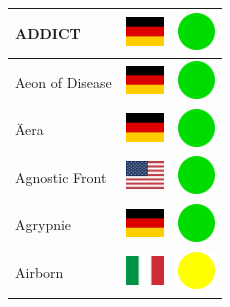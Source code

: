 \documentclass[12pt, a4paper, twoside]{report}
\begin{document}
\begin{center}
\begin{longtable}{|p{5cm}|p{2cm}|p{2cm}|}
			ADDICT & \includegraphics[width=1cm]{4x3/de} & \includegraphics[width=1cm]{likes/y} \\ \hline
			Aeon of Disease & \includegraphics[width=1cm]{4x3/de} & \includegraphics[width=1cm]{likes/y} \\ \hline
			Äera & \includegraphics[width=1cm]{4x3/de} & \includegraphics[width=1cm]{likes/y} \\ \hline
			Agnostic Front & \includegraphics[width=1cm]{4x3/us} & \includegraphics[width=1cm]{likes/y} \\ \hline
			Agrypnie & \includegraphics[width=1cm]{4x3/de} & \includegraphics[width=1cm]{likes/y} \\ \hline
			Airborn & \includegraphics[width=1cm]{4x3/it} & \includegraphics[width=1cm]{likes/m} \\ \hline

\end{longtable}
\end{center}
\end{document}
